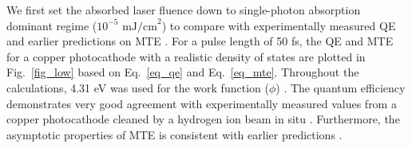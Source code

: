 We first set the absorbed laser fluence down to single-photon absorption dominant regime ($10^{-5} \textrm{ mJ/cm}^2$) to compare with experimentally measured QE \cite{Dowell2006} and earlier predictions on MTE \cite{dowell2009_QuantumEfficiencyThermal,Feng2015,Dimitrov2017}. For a pulse length of 50 fs, the QE and MTE for a copper photocathode with a realistic density of states are plotted in Fig.~\ref{fig_low} based on Eq.~\ref{eq_qe} and Eq.~\ref{eq_mte}.
Throughout the calculations, 4.31 eV was used for the work function ($\phi$) \cite{Dowell2006}. The quantum efficiency demonstrates very good agreement with experimentally measured values from a copper photocathode cleaned by a hydrogen ion beam in situ \cite{Dowell2006}. Furthermore, the asymptotic properties of MTE is consistent with earlier predictions \cite{dowell2009_QuantumEfficiencyThermal,Feng2015,Dimitrov2017}.

